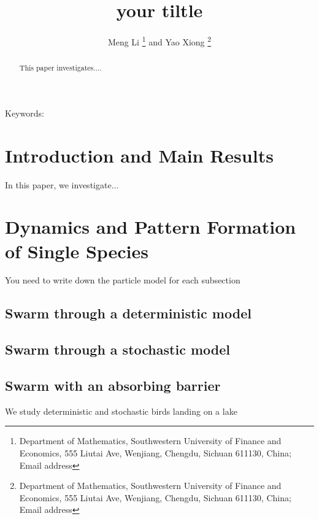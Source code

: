 \documentclass[twoside,12pt]{article}
\numberwithin{equation}{section}
\numberwithin{equation}{section}
\begin{document}
\title{\textbf{your tiltle}} 
\author{Meng Li \thanks{Department of Mathematics, Southwestern University of Finance and Economics, 555 Liutai Ave, Wenjiang, Chengdu, Sichuan 611130, China; Email address}
and Yao Xiong \thanks{Department of Mathematics, Southwestern University of Finance and Economics, 555 Liutai Ave, Wenjiang, Chengdu, Sichuan 611130, China;  Email address}
        }

\maketitle
\vspace{-8mm}
\begin{abstract}
This paper investigates....
\end{abstract}

%
%
%
{\sc Keywords}:  

\maketitle

\section{Introduction and Main Results}
In this paper, we investigate... 

\section{Dynamics and Pattern Formation of Single Species}
You need to write down the particle model for each subsection

\subsection{Swarm through a deterministic model}
\subsection{Swarm through a stochastic model}
\subsection{Swarm with an absorbing barrier}
We study deterministic and stochastic birds landing on a lake
\end{document}
